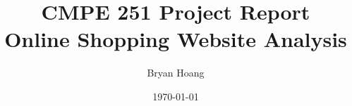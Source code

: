 \documentclass[
  draft,
]{memreport}
\title{
  \textbf{CMPE 251 Project Report}\\
  Online Shopping Website Analysis
}
\author{Bryan Hoang}
\date{\today}
\begin{document}
  \begin{titlingpage}
    \maketitle
  \end{titlingpage}

  \frontmatter{}

  \clearpage
  \tableofcontents
  \clearpage
  \listoffigures
  \listoftables

  \mainmatter{}

  
  
  
  
  
  

  \backmatter{}
\end{document}
